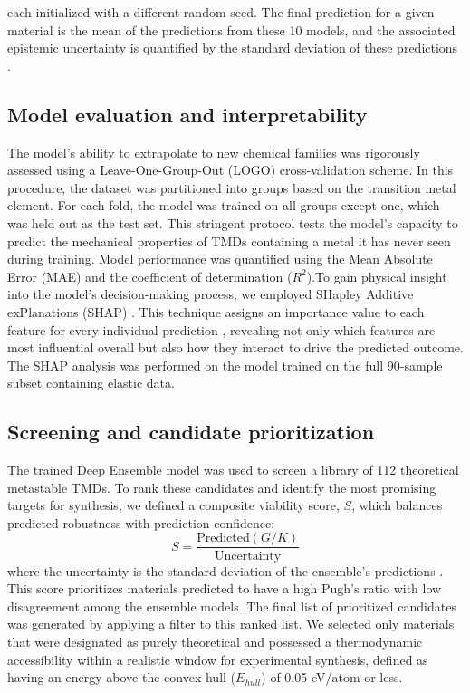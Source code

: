 \documentclass[]{article}
\begin{document}
each initialized with a different random seed. The final prediction for a given material is the mean of the predictions from these 10 models, and the associated epistemic uncertainty is quantified by the standard deviation of these predictions \citep{egele2022autodeuqautomateddeepensemble}.\subsection{Model evaluation and interpretability}The model's ability to extrapolate to new chemical families was rigorously assessed using a Leave-One-Group-Out (LOGO) cross-validation scheme. In this procedure, the dataset was partitioned into groups based on the transition metal element. For each fold, the model was trained on all groups except one, which was held out as the test set. This stringent protocol tests the model's capacity to predict the mechanical properties of TMDs containing a metal it has never seen during training. Model performance was quantified using the Mean Absolute Error (MAE) and the coefficient of determination ($R^2$).To gain physical insight into the model's decision-making process, we employed SHapley Additive exPlanations (SHAP) \citep{lundberg2017unifiedapproachinterpretingmodel}. This technique assigns an importance value to each feature for every individual prediction \citep{lundberg2017unifiedapproachinterpretingmodel}, revealing not only which features are most influential overall but also how they interact to drive the predicted outcome. The SHAP analysis was performed on the model trained on the full 90-sample subset containing elastic data.\subsection{Screening and candidate prioritization}The trained Deep Ensemble model was used to screen a library of 112 theoretical metastable TMDs. To rank these candidates and identify the most promising targets for synthesis, we defined a composite viability score, $S$, which balances predicted robustness with prediction confidence:\begin{equation}S = \frac{\text{Predicted}(G/K)}{\text{Uncertainty}}\end{equation}where the uncertainty is the standard deviation of the ensemble's predictions \citep{mcafee2026iconfusedconfusingdeep}. This score prioritizes materials predicted to have a high Pugh's ratio with low disagreement among the ensemble models \citep{mcafee2026iconfusedconfusingdeep}.The final list of prioritized candidates was generated by applying a filter to this ranked list. We selected only materials that were designated as purely theoretical and possessed a thermodynamic accessibility within a realistic window for experimental synthesis, defined as having an energy above the convex hull ($E_{hull}$) of 0.05 eV/atom or less.
\end{document}
